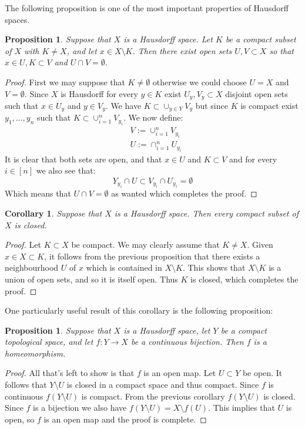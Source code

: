\documentclass[11pt,a4paper]{article}
\theoremstyle{definition}
\theoremstyle{plain}
\newtheorem{proposition}[theorem]{Proposition}
\newtheorem{corollary}[theorem]{Corollary}
\begin{document}
	The following proposition is one of the most important properties of
	Hausdorff spaces.
	\begin{proposition}
		Suppose that $X$ is a Hausdorff space. Let $K$ be a compact subset
		of $X$ with $K \neq X$, and let $x \in X \setminus K$. Then there 	
		exist open sets $U, V \subset X$ so that $x \in U , K \subset V$ 
		and $U \cap V = \emptyset$.
	\end{proposition}
	\begin{proof}
		First we may suppose that $K \neq \emptyset$ otherwise we could
		choose $U = X$ and $V = \emptyset$. Since $X$ is Hausdorff for
		every $y \in K$ exist $U_y, V_y \subset X$ disjoint open sets 
		such that $x \in U_y$ and $y \in V_y$. We have 
		$K \subset \cup_{y \in Y}{V_y}$ but since $K$ is compact exist
		$y_1,\dots,y_n$ such that $K \subset \cup_{i=1}^{n}{V_{y_i}}$.
		We now define:
		\begin{align*}
			&V := \cup_{i=1}^{n}{V_{y_i}} \\
			&U := \cap_{i=1}^{n}{U_{y_i}}
		\end{align*}
		It is clear that both sets are open, and that $x \in U$ and
		$K \subset V$ and for every $i \in [n]$ we also see that:
		\[
			Y_{y_i} \cap U \subset V_{y_i} \cap U_{y_i} = \emptyset
		\]
		Which means that $U \cap V = \emptyset$ as wanted which completes
		the proof.
	\end{proof}
	\begin{corollary}
		Suppose that $X$ is a Hausdorff space. Then every compact subset
		of $X$ is closed.
	\end{corollary}
	\begin{proof}
		Let $K \subset X$ be compact. We may clearly assume that 
		$K \neq X$. Given $x \in X \subset K$, it follows from the previous
		proposition that there exists a neighbourhood $U$ of $x$ which is 
		contained in $X \setminus K$. This shows that $X \setminus K$ is a 
		union of open sets, and so it is itself open. Thus $K$ is 
		closed, which completes the proof. 
	\end{proof}
	One particularly useful result of this corollary is the following
	proposition:
	\begin{proposition}
		Suppose that $X$ is a Hausdorff space, let $Y$ be a compact 
		topological space, and let $f \colon Y \to X$ be a continuous 
		bijection. Then $f$ is a homeomorphism.
	\end{proposition}
	\begin{proof}
		All that's left to show is that $f$ is an open map. Let $U \subset Y$
		be open. It follows that $Y \setminus U$ is closed in a compact space
		and thus compact. Since $f$ is continuous $f(Y \setminus U)$ is
		compact. From the previous corollary $f(Y \setminus U)$ is closed.
		Since $f$ is a bijection we also have 
		$f(Y \setminus U) = X \setminus f(U)$. This implies that $U$ is open,
		so $f$ is an open map and the proof is complete.
	\end{proof}
	
\end{document}
